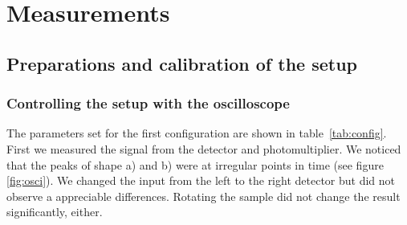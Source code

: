 \section{Measurements}
\label{sec:measurements}

\subsection{Preparations and calibration of the setup}
\label{sub:preparations_and_calibration_of_the_setup}
\subsubsection{Controlling the setup with the oscilloscope}
\label{ssub:Controlling the setup with the oscilloscope}
The parameters set for the first configuration are shown in table~\ref{tab:config}. 
First we measured the signal from the detector and photomultiplier. We noticed
that the peaks of shape a) and b) were at irregular points in time (see figure \ref{fig:osci}). 
We changed the input from the left to the right detector but did not observe a appreciable differences.
Rotating the sample did not
change the result significantly, either. 
\\
\\
